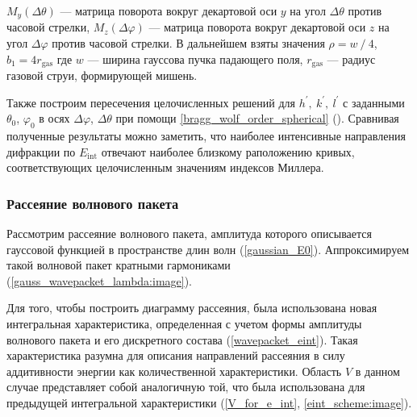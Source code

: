  $M_y(\Delta \theta)$ --- матрица поворота вокруг декартовой оси $y$ на угол $\Delta\theta$ против часовой стрелки, $M_z(\Delta\varphi)$ --- матрица поворота вокруг декартовой оси $z$ на угол $\Delta\varphi$ против часовой стрелки. В дальнейшем взяты значения $\rho = w\:/\:4$, $b_1 = 4r_{\textrm{gas}}$ где $w$ --- ширина гауссова пучка падающего поля, $r_{\textrm{gas}}$ --- радиус газовой струи, формирующей мишень.

Также построим пересечения целочисленных решений для $h^\prime,\:k^\prime,\:l^\prime$ с заданными $\theta_0$, $\varphi_0$ в осях $\Delta \varphi$, $\Delta \theta$ при помощи \autoref{bragg_wolf_order_spherical} (). Сравнивая полученные результаты можно заметить, что наиболее интенсивные направления дифракции по $E_{\textrm{int}}$ отвечают наиболее близкому раположению кривых, соответствующих целочисленным значениям индексов Миллера. 




\subsubsection{Рассеяние волнового пакета}

Рассмотрим рассеяние волнового пакета, амплитуда которого описывается гауссовой функцией в пространстве длин волн (\autoref{gaussian_E0}). Аппроксимируем такой волновой пакет кратными гармониками (\autoref{gauss_wavepacket_lambda:image}).


Для того, чтобы построить диаграмму рассеяния, была использована новая интегральная характеристика, определенная с учетом формы амплитуды волнового пакета и его дискретного состава (\autoref{wavepacket_eint}). Такая характеристика разумна для описания направлений рассеяния в силу аддитивности энергии как количественной характеристики. Область $V$ в данном случае представляет собой аналогичную той, что была использована для предыдущей интегральной характеристики (\autoref{V_for_e_int}, \autoref{eint_scheme:image}).

